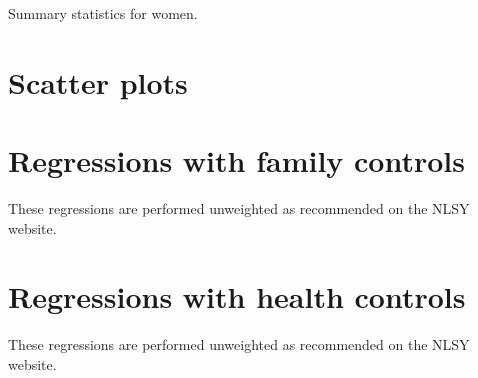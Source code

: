 \documentclass{article}
\begin{document}
\begin{table}[h]
\label{tab:summary_women}
\caption{Summary statistics for women.}

\end{table}

\clearpage

\section{Scatter plots}

\section{Regressions with family controls}
These regressions are performed unweighted as recommended on the NLSY website.

\begin{landscape}

\end{landscape}

\begin{landscape}

\end{landscape}

\clearpage

\section{Regressions with health controls}
These regressions are performed unweighted as recommended on the NLSY website.




\end{document}
